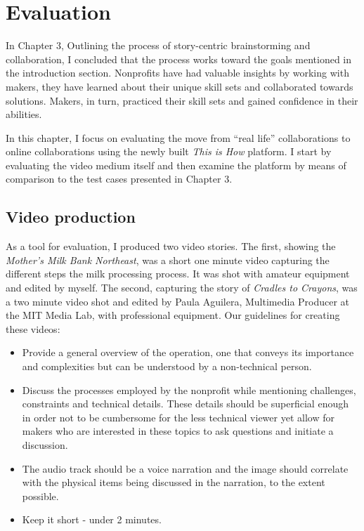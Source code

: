 \chapter{Evaluation}
\label{chap_eval}

In Chapter 3, Outlining the process of story-centric brainstorming and collaboration, I concluded that the process works toward the goals mentioned in the introduction section. Nonprofits have had valuable insights by working with makers, they have learned about their unique skill sets and collaborated towards solutions. Makers, in turn, practiced their skill sets and gained confidence in their abilities.

In this chapter, I focus on evaluating the move from ``real life'' collaborations to online collaborations using the newly built \textit{This is How} platform. I start by evaluating the video medium itself and then examine the platform by means of comparison to the test cases presented in Chapter 3.

\section{Video production} As a tool for evaluation, I produced two video stories. The first, showing the \textit{Mother's Milk Bank Northeast}, was a short one minute video capturing the different steps the milk processing process. It was shot with amateur equipment and edited by myself. The second, capturing the story of \textit{Cradles to Crayons}, was a two minute video shot and edited by Paula Aguilera, Multimedia Producer at the MIT Media Lab, with professional equipment. Our guidelines for creating these videos: 

\begin{itemize}
   \item Provide a general overview of the operation, one that conveys its importance and complexities but can be understood by a non-technical person.   
   \item Discuss the processes employed by the nonprofit while mentioning challenges, constraints and technical details. These details should be superficial enough in order not to be cumbersome for the less technical viewer yet allow for makers who are interested in these topics to ask questions and initiate a discussion.
   \item The audio track should be a voice narration and the image should correlate with the physical items being discussed in the narration, to the extent possible. 
   \item Keep it short - under 2 minutes. 
\end{itemize}

